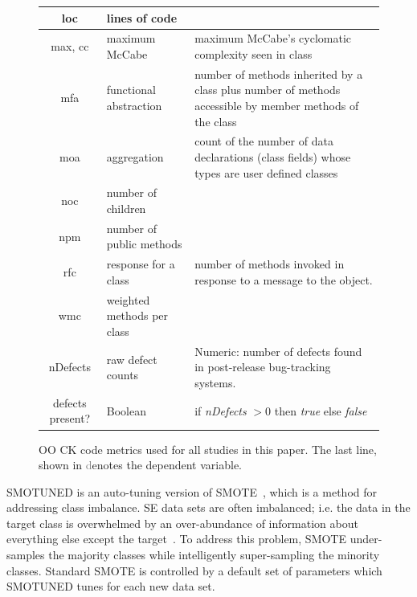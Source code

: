 \documentclass[10pt,conference]{IEEEtran}
\theoremstyle{break}
\theoremstyle{break}
\newcommand{\sma}{{\sc SMOTE}}
\newcommand{\smb}{{\sc SMOTUNED}}
\begin{document}
\begin{figure}[!t]
\begin{center}
{\begin{tabular}{c|l|p{4.0in}}
\hline
loc & lines of code &\\
\hline
max, cc & maximum McCabe & maximum McCabe's cyclomatic complexity seen
in class\\
\hline
mfa & functional abstraction & number of methods inherited by a class
plus number of methods accessible by member methods of the
class\\
\hline
moa & aggregation & count of the number of data declarations (class
fields) whose types are user defined classes\\
\hline
noc & number of children &\\
\hline
npm & number of public methods & \\
\hline
rfc & response for a class &number of methods invoked in response to
a message to the object.\\
\hline
wmc & weighted methods per class &\\
\hline
 
nDefects & raw defect counts & Numeric: number of defects found in post-release bug-tracking systems.\\
\rowcolor{lightgray}
defects present? & Boolean& if {\em nDefects} $>0$ then {\em true} else {\em false}
\end{tabular}
}
\end{center}
\caption{OO CK code metrics used for all studies in this paper.
The last line, shown in \textcolor{gray} denotes the dependent variable.}
\label{fig:ck}
\vspace{-0.7cm}
\end{figure}


SMOTUNED is an auto-tuning version of  SMOTE~\cite{chawla2002smote}, which is
a method for addressing class imbalance. SE data
sets are often imbalanced; i.e. the data in the target class is overwhelmed by an over-abundance of information about everything else except the target~\cite{menzies2007problems}. To
address this problem, {\sma} under-samples
the majority classes while intelligently super-sampling  the minority classes. Standard
{\sma} is controlled by a default
set of parameters which {\smb} tunes 
for each new data set. 
\end{document}
